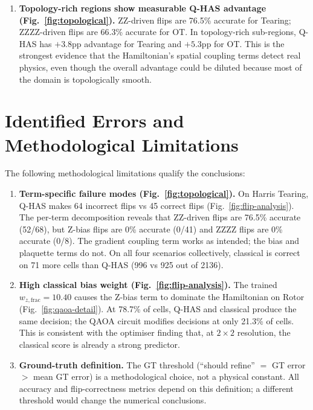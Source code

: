\documentclass[12pt, a4paper, oneside]{report}
\begin{document}
\begin{enumerate}
    \item \textbf{Topology-rich regions show measurable Q-HAS advantage (Fig.~\ref{fig:topological}).} ZZ-driven flips are 76.5\% accurate for Tearing; ZZZZ-driven flips are 66.3\% accurate for OT. In topology-rich sub-regions, Q-HAS has $+3.8$pp advantage for Tearing and $+5.3$pp for OT. This is the strongest evidence that the Hamiltonian's spatial coupling terms detect real physics, even though the overall advantage could be diluted because most of the domain is topologically smooth.
\end{enumerate}

\section{Identified Errors and Methodological Limitations}
\label{sec:identified-errors}

The following methodological limitations qualify the conclusions:

\begin{enumerate}

    \item \textbf{Term-specific failure modes (Fig.~\ref{fig:topological}).}
    On Harris Tearing, Q-HAS makes 64 incorrect flips vs 45 correct flips (Fig.~\ref{fig:flip-analysis}).  The per-term decomposition reveals that ZZ-driven flips are 76.5\% accurate (52/68), but Z-bias flips are 0\% accurate (0/41) and ZZZZ flips are 0\% accurate (0/8).  The gradient coupling term works as intended; the bias and plaquette terms do not.  On all four scenarios collectively, classical is correct on 71 more cells than Q-HAS (996 vs 925 out of 2136).

    \item \textbf{High classical bias weight (Fig.~\ref{fig:flip-analysis}).}
    The trained $w_{z,\text{frac}} = 10.40$ causes the Z-bias term to dominate the Hamiltonian on Rotor (Fig.~\ref{fig:qaoa-detail}).  At 78.7\% of cells, Q-HAS and classical produce the same decision; the QAOA circuit modifies decisions at only 21.3\% of cells.  This is consistent with the optimiser finding that, at $2\times 2$ resolution, the classical score is already a strong predictor.

    \item \textbf{Ground-truth definition.}
    The GT threshold (``should refine'' $=$ GT error $>$ mean GT error) is a methodological choice, not a physical constant.  All accuracy and flip-correctness metrics depend on this definition; a different threshold would change the numerical conclusions.
\end{enumerate}
\end{document}
